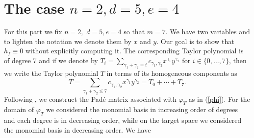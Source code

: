 \documentclass[letterpaper,11pt]{amsart}
\theoremstyle{plain}
\theoremstyle{definition}
\begin{document}
\section{The case $n=2,d=5,e=4$}\label{subsection: example}
For this part we fix $n=2,$ $d=5,e=4$ so that $m=7$. We have two variables and to lighten the notation we denote them by $x$ and $y$. Our goal is to show that $h_f \equiv 0$ without explicitly computing it. 
The corresponding Taylor polynomial is of degree 7 and if we denote by $T_i=\sum_{\gamma_1+\gamma_2=i}c_{\gamma_1,\gamma_2}x^{\gamma_1}y^{\gamma_2}$ for $ i \in \{0,\dots,7\}$, then we write the Taylor polynomial $T$ in terms of its homogeneous components as $$
T=\sum_{\gamma_1+\gamma_2 \leq 7}c_{\gamma_1,\gamma_2}x^{\gamma_1}y^{\gamma_2}=T_0+\cdots+T_7.$$   
Following , we construct the Pad\'e matrix associated with $\varphi_T$ as in (\ref{phi}). For the domain of $\varphi_T$ we considered the monomial basis in increasing order of degrees and each degree is in decreasing order, while on the target space we considered the monomial basis in decreasing order. We have
\end{document}
